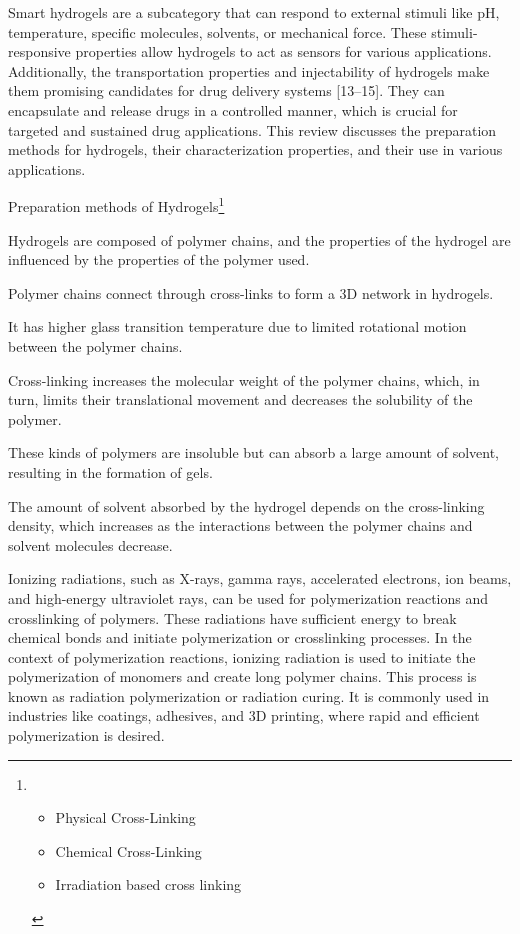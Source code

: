 \documentclass[../../main-notes.tex]{subfiles}
\begin{document}
Smart hydrogels are a subcategory that can respond to external stimuli like pH, temperature, specific molecules, solvents, or mechanical force. 
These stimuli-responsive properties allow hydrogels to act as sensors for various applications. 
Additionally, the transportation properties and injectability of hydrogels make them promising candidates for drug delivery systems [13–15]. 
They can encapsulate and release drugs in a controlled manner, which is crucial for targeted and sustained drug applications. 
This review discusses the preparation methods for hydrogels, their characterization properties, and their use in various applications.



Preparation methods of Hydrogels\footnote{
    \begin{itemize}
        \item Physical Cross-Linking
        \item Chemical Cross-Linking
        \item Irradiation based cross linking
    \end{itemize}
}

Hydrogels are composed of polymer chains, and the properties of the hydrogel are influenced by the properties of the polymer used.

Polymer chains connect through cross-links to form a 3D network in hydrogels. 


It has higher glass transition temperature due to limited rotational motion between the polymer chains. 

Cross-linking increases the molecular weight of the polymer chains, which, in turn, limits their translational movement and decreases the solubility of the polymer.

These kinds of polymers are insoluble but can absorb a large amount of solvent, resulting in the formation of gels.

The amount of solvent absorbed by the hydrogel depends on the cross-linking density, which increases as the interactions between the polymer chains and solvent molecules decrease.



Ionizing radiations, such as X-rays, gamma rays, accelerated electrons, ion beams, and high-energy ultraviolet rays, can be used for polymerization reactions and crosslinking of polymers. 
These radiations have sufficient energy to break chemical bonds and initiate polymerization or crosslinking processes. 
In the context of polymerization reactions, ionizing radiation is used to initiate the polymerization of monomers and create long polymer chains. 
This process is known as radiation polymerization or radiation curing. 
It is commonly used in industries like coatings, adhesives, and 3D printing, where rapid and efficient polymerization is desired. 
\end{document}
